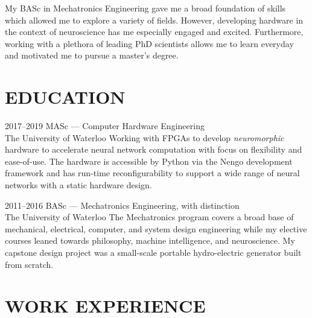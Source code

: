 \documentclass[a4paper,nocolors]{cv-friggeri-ben}
\begin{document}
\vspace{-5pt}
My BASc in Mechatronics Engineering gave me a broad foundation of skills which
allowed me to explore a variety of fields. However, developing hardware in the
context of neuroscience has me especially engaged and excited. Furthermore,
working with a plethora of leading PhD scientists allows me to learn everyday
and motivated me to pursue a master's degree.



\section{EDUCATION}
\vspace{-2pt}

\begin{entrylist}

\entry
    {2017--2019}
    {MASc {\normalfont --- Computer Hardware Engineering}}
    {\\The University of Waterloo}
    {Working with FPGAs to develop \textit{neuromorphic} hardware to
    accelerate neural network computation with focus on flexibility and
    ease-of-use. The hardware is accessible by Python via the Nengo development
    framework and has run-time reconfigurability to support a wide range of
    neural networks with a static hardware design.}

\entry
    {2011--2016}
    {BASc {\normalfont --- Mechatronics Engineering, with distinction}}
    {\\The University of Waterloo}
    {The Mechatronics program covers a broad base of mechanical, electrical,
    computer, and system design engineering while my elective courses leaned
    towards philosophy, machine intelligence, and neuroscience. My capstone
    design project was a small-scale portable hydro-electric generator built
    from scratch.}

\end{entrylist}


\section{WORK EXPERIENCE}
\vspace{-2pt}
\end{document}
